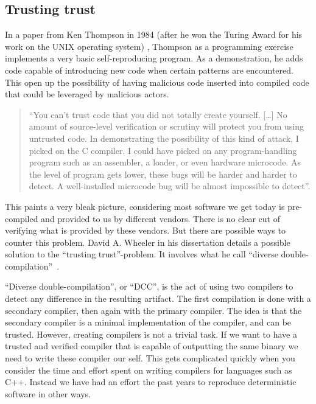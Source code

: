 \documentclass[../Main/thesis.tex]{subfiles}
\begin{document}
\subsection*{Trusting trust}
In a paper from Ken Thompson in 1984 (after he won the Turing Award for his work
on the UNIX operating system) ,
Thompson as a programming exercise implements a very basic self-reproducing
program. As a demonstration, he adds code capable of introducing new code when
certain patterns are encountered. This open up the possibility of having
malicious code inserted into compiled code that could be leveraged by malicious
actors.

\begin{quotation}
``You can't trust code that you did not totally create yourself. [\ldots] No amount
of source-level verification or scrutiny will protect you from using untrusted
code. In demonstrating the possibility of this kind of attack, I picked on the C
compiler. I could have picked on any program-handling program such as an
assembler, a loader, or even hardware microcode. As the level of program gets
lower, these bugs will be harder and harder to detect. A well-installed
microcode bug will be almost impossible to
detect''\cite{Thompson:1984:RTT:358198.358210}.
\end{quotation}

This paints a very bleak picture, considering most software we get today is
pre-compiled and provided to us by different vendors. There is no clear cut of
verifying what is provided by these vendors. But there are possible ways to
counter this problem.  David A. Wheeler in his dissertation
 details a possible solution to the
``trusting trust''-problem. It involves what he call ``diverse
double-compilation''~\cite{Wheeler:2005:CTT:1106778.1106809}.

``Diverse double-compilation'', or ``DCC'', is the act of using two compilers to
detect any difference in the resulting artifact. The first compilation is done
with a secondary compiler, then again with the primary compiler. The idea is
that the secondary compiler is a minimal implementation of the compiler, and can
be trusted. However, creating compilers is not a trivial task. If we want to
have a trusted and verified compiler that is capable of outputting the same
binary we need to write these compiler our self. This gets complicated quickly
when you consider the time and effort spent on writing compilers for languages
such as C++. Instead we have had an effort the past years to reproduce
deterministic software in other ways.
\end{document}
